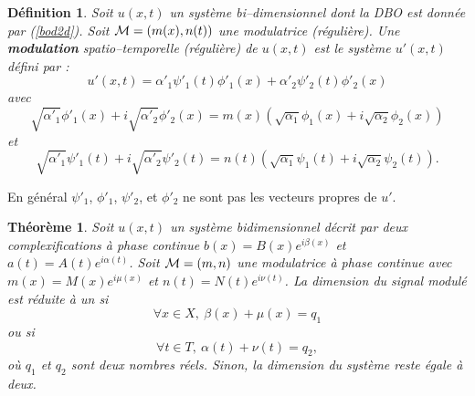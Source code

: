 \documentclass{book}
\newtheorem{thm}{Th\'eor\`eme}[chapter]
\newtheorem{defn}{D\'efinition}[chapter]
\begin{document}
\begin{defn}
Soit $u(x,t)$ un syst\`eme bi--dimensionnel dont la DBO est donn\'ee par
(\ref{bod2d}). Soit ${\cal M}=(m(x),n(t))$ une modulatrice
(r\'eguli\`ere). 
Une {\bf modulation} spatio--temporelle (r\'eguli\`ere) de $u(x,t)$ est le syst\`eme 
$u'(x,t)$ d\'efini par :
\begin{equation}
u'(x,t)={\alpha'_1}\psi'_1(t)\phi'_1(x)+{\alpha'_2}\psi'_2(t)\phi'_2(x)
\end{equation}
avec
\begin{equation}
\sqrt{\alpha'_1}\phi'_1(x)+i\sqrt{\alpha'_2}\phi'_2(x)=m(x)(\sqrt{\alpha_1}\phi_1(x)+i\sqrt{\alpha_2}\phi_2(x))
\end{equation}
et
\begin{equation}
\sqrt{\alpha'_1}\psi'_1(t)+i\sqrt{\alpha'_2}\psi'_2(t)=n(t)
(\sqrt{\alpha_1}\psi_1(t)+i\sqrt{\alpha_2}\psi_2(t)).
\end{equation}

\end{defn}

En g\'en\'eral $\psi'_1$, $\phi'_1$, $\psi'_2$, et $\phi'_2$
ne sont pas les vecteurs propres de $u'$.


\begin{thm}
Soit $u(x,t)$ un syst\`eme bidimensionnel d\'ecrit par deux
complexifications \`a phase continue $b(x)=B(x)e^{i\beta(x)}$ et
$a(t)=A(t)e^{i\alpha(t)}$. Soit ${\cal M}=(m,n)$ une modulatrice \`a
phase continue avec $m(x)=M(x)e^{i\mu(x)}$ et $n(t)=N(t)e^{i\nu(t)}$.
La dimension du signal modul\'e est r\'eduite \`a un si 
\begin{equation}
\forall x\in X,\ \beta(x)+\mu(x)=q_1
\end{equation}
ou si
\begin{equation}\label{eqcondred}
\forall t\in T,\ \alpha(t)+\nu(t)=q_2,
\end{equation}
o\`u $q_1$ et $q_2$ sont deux nombres r\'eels. Sinon, la dimension du
syst\`eme reste \'egale \`a deux.
\end{thm}
\end{document}
